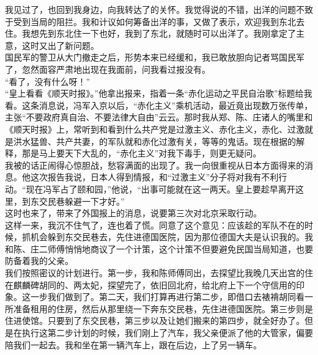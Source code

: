 我见过了，也回到我身边，向我转达了的关怀。我觉得说的不错，出洋的问题不致于受到当局的阻拦。我和计议如何筹备出洋的事，又做了表示，欢迎我到东北去住。我想先到东北住一下也好，我到了东北，就随时可以出洋了。我刚拿定了主意，这时又出了新问题。\\

国民军的警卫从大门撤走之后，形势本来已经缓和，我已敢放胆向记者骂国民军了，忽然面容严肃地出现在我面前，问我看过报没有。\\

“看了，没有什么呀！”\\

“皇上看看《顺天时报》。”他拿出报来，指着一条“赤化运动之平民自治歌”标题给我看。这条消息说，冯军入京以后，“赤化主义”乘机活动，最近竟出现数万张传单，主张“不要政府真自治、不要法律大自由”云云。那时我从郑、陈、庄诸人的嘴里和《顺天时报》上，常听到和看到什么共产党是过激主义、赤化主义，赤化、过激就是洪水猛兽、共产共妻，的军队就和赤化过激有关，等等的鬼话。现在根据的解释，那是马上要天下大乱的，“赤化主义”对我下毒手，则更无疑问。\\

我被的话正闹得心惊胆战，愁容满面的出现了。我一向很重视从日本方面得来的消息。他这次报告我说，日本人得到情报，和“过激主义”分子将对我有不利行动。“现在冯军占了颐和园，”他说，“出事可能就在这一两天。皇上要趁早离开这里，到东交民巷躲避一下才好。”\\

这时也来了，带来了外国报上的消息，说要第三次对北京采取行动。\\

这样一来，我沉不住气了，连也着了慌。同意了这个意见：应该趁的军队不在的时候，抓机会躲到东交民巷去，先住进德国医院，因为那位德国大夫是认识我的。我和陈、庄二师傅悄悄地商议了一个计策，这个计策不但要避免民国当局知道，也要防备着我的父亲。\\

我们按照密议的计划进行。第一步，我和陈师傅同出，去探望比我晚几天出宫的住在麒麟碑胡同的、两太妃，探望完了，依旧回北府，给北府上下一个守信用的印象。这一步我们做到了。第二天，我们打算再进行第二步，即借口去裱褙胡同看一所准备租用的住房，然后从那里绕一下奔东交民巷，先住进德国医院。第三步则是住进使馆。只要到了东交民巷，第三步以及让她们搬来的第四步，就全好办了。但是在执行这第二步计划的时候，我们刚上了汽车，我父亲便派了他的大管家，偏要陪我们一起去。我和坐在第一辆汽车上，跟在后边，上了另一辆车。\\

